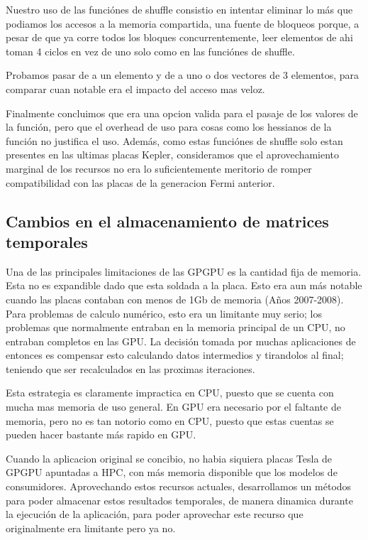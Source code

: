Nuestro uso de las funci\'ones de shuffle consistio en intentar eliminar lo m\'as que podiamos
los accesos a la memoria compartida, una fuente de bloqueos porque, a pesar de que ya corre
todos los bloques concurrentemente, leer elementos de ahi toman 4 ciclos en vez de uno solo
como en las funci\'ones de shuffle.

Probamos pasar de a un elemento y de a uno o dos vectores de 3 elementos, para comparar
cuan notable era el impacto del acceso mas veloz.

Finalmente concluimos que era una opcion valida para el pasaje de los valores de la funci\'on,
pero que el overhead de uso para cosas como los hessianos de la funci\'on no justifica el uso.
Adem\'as, como estas funci\'ones de shuffle solo estan presentes en las ultimas placas Kepler,
consideramos que el aprovechamiento marginal de los recursos no era lo suficientemente meritorio
de romper compatibilidad con las placas de la generacion Fermi anterior.


\subsection{Cambios en el almacenamiento de matrices temporales}
Una de las principales limitaciones de las GPGPU es la cantidad fija de memoria. Esta no es
expandible dado que esta soldada a la placa. Esto era aun m\'as notable cuando las placas
contaban con menos de 1Gb de memoria (A\~nos 2007-2008).
Para problemas de calculo num\'erico, esto era un limitante muy serio; los problemas que
normalmente entraban en la memoria principal de un CPU, no entraban completos en las GPU.
La decisi\'on tomada por muchas aplicaciones de entonces es compensar esto calculando
datos intermedios y tirandolos al final; teniendo que ser recalculados en las proximas iteraciones.

Esta estrategia es claramente impractica en CPU, puesto que se cuenta con mucha mas memoria
de uso general. En GPU era necesario por el faltante de memoria, pero no es tan notorio como en CPU,
puesto que estas cuentas se pueden hacer bastante m\'as rapido en GPU.

Cuando la aplicacion original se concibio, no habia siquiera placas Tesla de GPGPU apuntadas a HPC, con
m\'as memoria disponible que los modelos de consumidores. Aprovechando estos recursos actuales,
desarrollamos un m\'etodos para poder almacenar estos resultados temporales, de manera dinamica
durante la ejecuci\'on de la aplicaci\'on, para poder aprovechar este recurso que originalmente
era limitante pero ya no.

